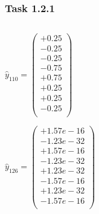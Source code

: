\documentclass[10pt,aspectratio=169,handout]{beamer}
\begin{document}
\begin{frame}
    \frametitle{Task 1.2.1}
    \inputminted[bgcolor=LightGray,fontsize=\small]{python}{calcyhat.py}
    \begin{minipage}{0.45\textwidth}
        $\hat{y}_{110}= \begin{pmatrix}
                +0.25 \\
                -0.25 \\
                -0.25 \\
                -0.75 \\
                +0.75 \\
                +0.25 \\
                +0.25 \\
                -0.25 \\
            \end{pmatrix}$
    \end{minipage}
    \begin{minipage}{0.45\textwidth}
        $\hat{y}_{126}= \begin{pmatrix}
                +1.57e-16 \\
                -1.23e-32 \\
                +1.57e-16 \\
                -1.23e-32 \\
                +1.23e-32 \\
                -1.57e-16 \\
                +1.23e-32 \\
                -1.57e-16 \\
            \end{pmatrix}$
    \end{minipage}
\end{frame}
\end{document}
